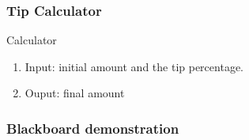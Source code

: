 \begin{frame}[fragile]
\frametitle{Tip Calculator}

\begin{block}{Calculator}
\begin{enumerate}
\item Input: initial amount and the tip percentage.
\item Ouput: final amount
\end{enumerate}
\end{block}
\end{frame}

\begin{frame}[fragile]
\frametitle{Blackboard demonstration}

\end{frame}


